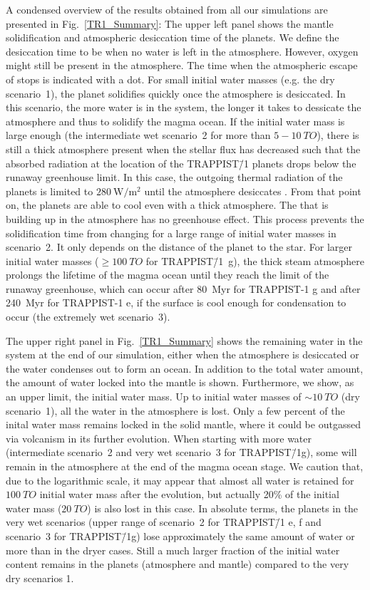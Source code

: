 \documentclass[oneside,twocolumn]{article}
\newcommand{\eg}{e.g. }
\begin{document}
A condensed overview of the results obtained from all our simulations are presented in Fig.~\ref{TR1_Summary}:
The upper left panel shows the mantle solidification and atmospheric desiccation time of the planets.
We define the desiccation time to be when no water is left in the atmosphere. 
However, oxygen might still be present in the atmosphere.
The time when the atmospheric escape of  stops is indicated with a dot.
For small initial water masses (\eg the dry scenario~1), the planet solidifies quickly once the atmosphere is desiccated. 
In this scenario, the more water is in the system, the longer it takes to dessicate the atmosphere and thus to solidify the magma ocean.
If the initial water mass is large enough (the intermediate wet scenario~2 for more than $5-\SI{10}{TO}$), there is still a thick  atmosphere present when the stellar flux has decreased such that the absorbed radiation at the location of the TRAPPIST\=/1 planets drops below the runaway greenhouse limit. 
In this case, the outgoing thermal radiation of the planets is limited to $\SI{280}{\watt\per\square\metre}$ until the atmosphere desiccates \citep[Section \ref{Sec_Flux}][]{Goldblatt2013}.
From that point on, the planets are able to cool even with a thick atmosphere.
The  that is building up in the atmosphere has no greenhouse effect.
This process prevents the solidification time from changing for a large range of initial water masses in scenario~2. 
It only depends on the distance of the planet to the star.
For larger initial water masses ($\ge \SI{100}{TO}$ for TRAPPIST\=/1~g), the thick steam atmosphere prolongs the lifetime of the magma ocean until they reach the limit of the runaway greenhouse, which can occur after 80~Myr for TRAPPIST-1 g and after 240~Myr for TRAPPIST-1 e, if the surface is cool enough for  condensation to occur (the extremely wet scenario~3).

The upper right panel in  Fig.~\ref{TR1_Summary} shows the remaining water in the system at the end of our simulation, either when the atmosphere is desiccated or the water condenses out to form an ocean.
In addition to the total water amount, the amount of water locked into the mantle is shown. 
Furthermore, we show, as an upper limit, the initial water mass.
Up to initial water masses of $\sim \SI{10}{TO}$ (dry scenario~1), all the water in the atmosphere is lost. Only a few percent of the inital water mass remains locked in the solid mantle, where it could be outgassed via volcanism in its further evolution.
When starting with more water (intermediate scenario~2 and very wet scenario~3 for TRAPPIST\=/1g), some will remain in the atmosphere at the end of the magma ocean stage.
We caution that, due to the logarithmic scale, it may appear that almost all water is retained for $\SI{100}{TO}$ initial water mass after the evolution, but actually 20\% of the initial water mass ($\SI{20}{TO}$) is also lost in this case. 
In absolute terms, the planets in the very wet scenarios (upper range of scenario~2 for TRAPPIST\=/1 e, f and scenario~3 for TRAPPIST\=/1g) lose approximately the same amount of water or more than in the dryer cases. Still a much larger fraction of the initial water content remains in the planets (atmosphere and mantle) compared to the very dry scenarios 1.
\end{document}
